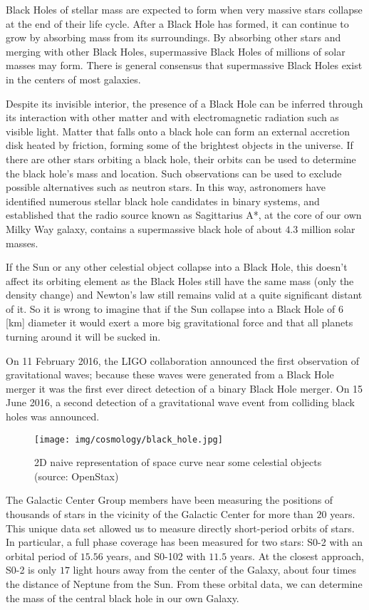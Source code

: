 	Black Holes of stellar mass are expected to form when very massive stars collapse at the end of their life cycle. After a Black Hole has formed, it can continue to grow by absorbing mass from its surroundings. By absorbing other stars and merging with other Black Holes, supermassive Black Holes of millions of solar masses may form. There is general consensus that supermassive Black Holes exist in the centers of most galaxies.

	Despite its invisible interior, the presence of a Black Hole can be inferred through its interaction with other matter and with electromagnetic radiation such as visible light. Matter that falls onto a black hole can form an external accretion disk heated by friction, forming some of the brightest objects in the universe. If there are other stars orbiting a black hole, their orbits can be used to determine the black hole's mass and location. Such observations can be used to exclude possible alternatives such as neutron stars. In this way, astronomers have identified numerous stellar black hole candidates in binary systems, and established that the radio source known as Sagittarius A*, at the core of our own Milky Way galaxy, contains a supermassive black hole of about $4.3$ million solar masses. 
	\begin{tcolorbox}[title=Remark,colframe=black,arc=10pt]
	If the Sun or any other celestial object collapse into a Black Hole, this doesn't affect its orbiting element as the Black Holes still have the same mass (only the density change) and Newton's law still remains valid at a quite significant distant of it. So it is wrong to imagine that if the Sun collapse into a Black Hole of $6$ [km] diameter it would exert a more big gravitational force and that all planets turning around it will be sucked in.
	\end{tcolorbox}
	
	On 11 February 2016, the LIGO collaboration announced the first observation of gravitational waves; because these waves were generated from a Black Hole merger it was the first ever direct detection of a binary Black Hole merger. On 15 June 2016, a second detection of a gravitational wave event from colliding black holes was announced.
	\begin{figure}[H]
		\centering
		\texttt{[image: img/cosmology/black\_hole.jpg]}	
		\caption{2D naive representation of space curve near some celestial objects (source: OpenStax)}
	\end{figure}
	The Galactic Center Group members have been measuring the positions of thousands of stars in the vicinity of the Galactic Center for more than $20$ years. This unique data set allowed us to measure directly short-period orbits of stars. In particular, a full phase coverage has been measured for two stars: S0-2 with an orbital period of $15.56$ years, and S0-102 with $11.5$ years. At the closest approach, S0-2 is only $17$ light hours away from the center of the Galaxy, about four times the distance of Neptune from the Sun. From these orbital data, we can determine the mass of the central black hole in our own Galaxy.

